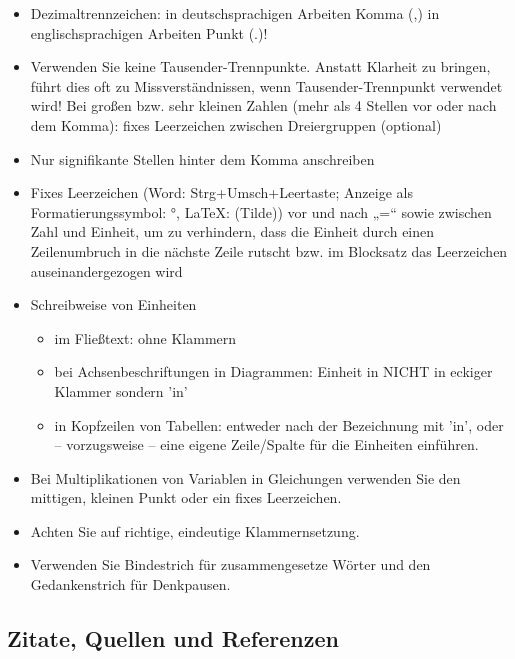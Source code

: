 \begin{itemize}
    \item Dezimaltrennzeichen: in deutschsprachigen Arbeiten Komma (,) in englischsprachigen Arbeiten Punkt (.)!
    \item Verwenden Sie keine Tausender-Trennpunkte. Anstatt Klarheit zu bringen, führt dies oft zu Missverständnissen, wenn Tausender-Trennpunkt verwendet wird! Bei großen bzw. sehr kleinen Zahlen (mehr als 4 Stellen vor oder nach dem Komma): fixes Leerzeichen zwischen Dreiergruppen (optional)
    \item Nur signifikante Stellen hinter dem Komma anschreiben
    \item Fixes Leerzeichen (Word: Strg+Umsch+Leertaste; Anzeige als Formatierungssymbol: °, LaTeX:\raisebox{-0.8ex}{\~{}} (Tilde)) vor und nach „=“ sowie zwischen Zahl und Einheit, um zu verhindern, dass die Einheit durch einen Zeilenumbruch in die nächste Zeile rutscht bzw. im Blocksatz das Leerzeichen auseinandergezogen wird
    
\newpage

    \item Schreibweise von Einheiten
    \begin{itemize}
        \item im Fließtext: ohne Klammern
        \item bei Achsenbeschriftungen in Diagrammen: Einheit in NICHT in eckiger Klammer sondern 'in'
        \item in Kopfzeilen von Tabellen: entweder nach der Bezeichnung mit 'in', oder – vorzugsweise – eine eigene Zeile/Spalte für die Einheiten einführen.
    \end{itemize}
    

    \item Bei Multiplikationen von Variablen in Gleichungen verwenden Sie den mittigen, kleinen Punkt oder ein fixes Leerzeichen.
    \item Achten Sie auf richtige, eindeutige Klammernsetzung.
    \item Verwenden Sie Bindestrich für zusammengesetze Wörter und den Gedankenstrich für Denkpausen.
\end{itemize}





\subsection{Zitate, Quellen und Referenzen}

